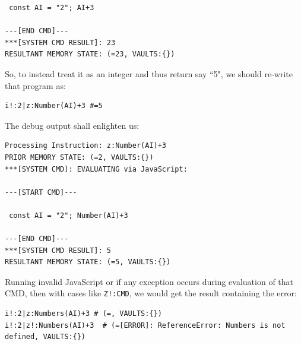 \documentclass[a4paper, 18pt]{book} %
\begin{document}
{{{{\begin{tcolorbox}[myterminalstyle, title=Debugging WEB TEA (EXAMPLE 5)]
\begin{lstlisting}
 const AI = "2"; AI+3 

---[END CMD]---
***[SYSTEM CMD RESULT]: 23
RESULTANT MEMORY STATE: (=23, VAULTS:{})             
  \end{lstlisting}
  \end{tcolorbox}
}

\vspace{2em}


So, to instead treat it as an integer and thus return say ``5", we should re-write that program as:


\vspace{2em}

  \begin{tcolorbox}[teaterminalstyle, title=Z: EXAMPLE 6: Running JavaScript from TEA on the WEB, breakable]
  \begin{lstlisting}[language=TEA,breaklines=true,]
i!:2|z:Number(AI)+3 #=5
   \end{lstlisting}
  \end{tcolorbox}

\vspace{2em}

The debug output shall enlighten us:



\vspace{2em}

{
  \begin{tcolorbox}[myterminalstyle, title=Debugging WEB TEA (EXAMPLE 5)]
  \begin{lstlisting}
Processing Instruction: z:Number(AI)+3
PRIOR MEMORY STATE: (=2, VAULTS:{})
***[SYSTEM CMD]: EVALUATING via JavaScript:

---[START CMD]---

 const AI = "2"; Number(AI)+3 

---[END CMD]---
***[SYSTEM CMD RESULT]: 5
RESULTANT MEMORY STATE: (=5, VAULTS:{})          
  \end{lstlisting}
  \end{tcolorbox}
}

\vspace{2em}


Running invalid JavaScript or if any exception occurs during evaluation of that CMD, then with cases like \texttt{Z!:CMD}, we would get the result containing the error:



\vspace{2em}

  \begin{tcolorbox}[teaterminalstyle, title=Z: EXAMPLE 7: ZAP Calls Exposing External Evaluation Errors, breakable]
  \begin{lstlisting}[language=TEA,breaklines=true,]
i!:2|z:Numbers(AI)+3 # (=, VAULTS:{})
i!:2|z!:Numbers(AI)+3  # (=[ERROR]: ReferenceError: Numbers is not defined, VAULTS:{})
   \end{lstlisting}
  \end{tcolorbox}

}}}
\end{document}
